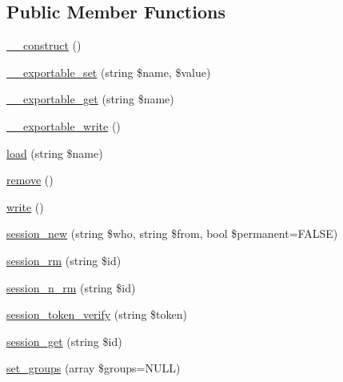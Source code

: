 \subsection*{Public Member Functions}
\begin{DoxyCompactItemize}
\item 
\hyperlink{classlibresignage_1_1common_1_1php_1_1auth_1_1User_a9edc67cbbe0d5ccc9a12e91e16b86733}{\+\_\+\+\_\+construct} ()
\item 
\hyperlink{classlibresignage_1_1common_1_1php_1_1auth_1_1User_ae0a863601a2494297950220e5a48ade7}{\+\_\+\+\_\+exportable\+\_\+set} (string \$name, \$value)
\item 
\hyperlink{classlibresignage_1_1common_1_1php_1_1auth_1_1User_a34a529c11ff99973e6e592432e8dceeb}{\+\_\+\+\_\+exportable\+\_\+get} (string \$name)
\item 
\hyperlink{classlibresignage_1_1common_1_1php_1_1auth_1_1User_aa52cfafebd570b33f4d0eaf2f7794538}{\+\_\+\+\_\+exportable\+\_\+write} ()
\item 
\hyperlink{classlibresignage_1_1common_1_1php_1_1auth_1_1User_a814c438b1299f1c13f89c9caef1f63a7}{load} (string \$name)
\item 
\hyperlink{classlibresignage_1_1common_1_1php_1_1auth_1_1User_a2119c5c129dc4e88b887e111b0b8566d}{remove} ()
\item 
\hyperlink{classlibresignage_1_1common_1_1php_1_1auth_1_1User_a9999be727981f0fef395fe0e95b6314d}{write} ()
\item 
\hyperlink{classlibresignage_1_1common_1_1php_1_1auth_1_1User_a1e1d5197720b85b2e47966fa5567d0b5}{session\+\_\+new} (string \$who, string \$from, bool \$permanent=F\+A\+L\+SE)
\item 
\hyperlink{classlibresignage_1_1common_1_1php_1_1auth_1_1User_a091ceafd0b7d8a0b5c2d8fec268c49de}{session\+\_\+rm} (string \$id)
\item 
\hyperlink{classlibresignage_1_1common_1_1php_1_1auth_1_1User_ab937b7fb2f9dc26bf6459cc14f2c678a}{session\+\_\+n\+\_\+rm} (string \$id)
\item 
\hyperlink{classlibresignage_1_1common_1_1php_1_1auth_1_1User_a74a4a47352df10199181c93bebbd802e}{session\+\_\+token\+\_\+verify} (string \$token)
\item 
\hyperlink{classlibresignage_1_1common_1_1php_1_1auth_1_1User_a0bebd7aa87fafd09205aee203ac18df5}{session\+\_\+get} (string \$id)
\item 
\hyperlink{classlibresignage_1_1common_1_1php_1_1auth_1_1User_a009ed0d4437ea0b21469f78be4cb8a0d}{set\+\_\+groups} (array \$groups=N\+U\+LL)

\end{DoxyCompactItemize}
